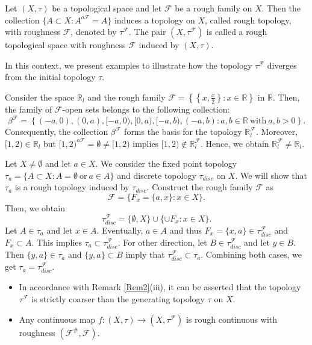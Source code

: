 \documentclass[11pt]{amsart}
\begin{document}
\begin{definition}
    Let $(X,\tau)$ be a topological space and let $\mathscr{F}$ be a rough family on $X$. %
    Then the collection $\{A\subset X: A^{o\mathscr{F}}=A\}$ induces a topology on $X$, called rough topology, with roughness $\mathscr{F}$, denoted by $\tau^\mathscr{F}$. The pair $(X,\tau^\mathscr{F})$ is called a rough topological space with roughness $\mathscr{F}$ induced by $(X,\tau)$.
\end{definition}

In this context, we present examples to illustrate how the topology $\tau^\mathscr{F}$ diverges from the initial topology $\tau$.
\begin{example}\label{Ex5}
    Consider the space $\mathbb{R}_l$ and the rough family $\mathscr{F}=\left\{\left\{x,\frac{x}{2}\right\}: x\in \mathbb{R}\right\}$ in $\mathbb{R}$. Then, the family of $\mathscr{F}$-open sets belongs to the following collection:
    $$\beta^\mathscr{F}=\left\{(-a,0),(0,a),[-a,0),[0,a), [-a,b),(-a,b): a,b\in \mathbb{R}~\text{with}~a,b>0\right\}.$$  
    Consequently, the collection $\beta^\mathscr{F}$ forms the basis for the topology $\mathbb{R}^\mathscr{F}_l$. Moreover, $[1,2)\in \mathbb{R}_l$ but $[1,2)^{o\mathscr{F}}=\emptyset\neq [1,2)$ implies $[1,2)\notin \mathbb{R}^\mathscr{F}_l$. Hence, we obtain $\mathbb{R}^\mathscr{F}_l\neq \mathbb{R}_l$.
\end{example}


\begin{example}
    Let $X\neq \emptyset$ and let $a\in X$. We consider the fixed point topology $\tau_a=\{A\subset X: A=\emptyset~\text{or}~ a\in A\}$ and discrete topology $\tau_{disc}$ on $X$. We will show that $\tau_a$ is a rough topology induced by $\tau_{disc}$. Construct the rough family $\mathscr{F}$ as $$\mathscr{F}=\{F_x=\{a,x\}: x\in X\}.$$
    Then, we obtain $$\tau_{disc}^\mathscr{F}=\{\emptyset, X\}\cup\{\cup F_x: x\in X\}.$$ 
    Let $A\in \tau_a$ and let $x\in A$. Eventually, $a\in A$ and thus $F_x=\{x,a\}\in \tau_{disc}^{\mathscr{F}}$ and $F_x\subset A$. This implies $\tau_a\subset \tau_{disc}^\mathscr{F}$. For other direction, let $B\in \tau_{disc}^\mathscr{F}$ and let $y\in B$. Then $\{y,a\}\in \tau_a$ and $\{y,a\}\subset B$ imply that $\tau_{disc}^\mathscr{F}\subset \tau_a$. Combining both cases, we get $\tau_a=\tau_{disc}^\mathscr{F}$.
\end{example}

\begin{remark}
\begin{itemize}
    \item[(i)] In accordance with Remark \ref{Rem2}(iii), it can be asserted that the topology $\tau^\mathscr{F}$ is strictly coarser than the generating topology $\tau$ on $X$.
    
    \item[(ii)] Any continuous map $f: (X,\tau)\to (X,\tau^\mathscr{F})$ is rough continuous with roughness $(\mathscr{F^\#},\mathscr{F}).$
\end{itemize}
\end{remark}
\end{document}
